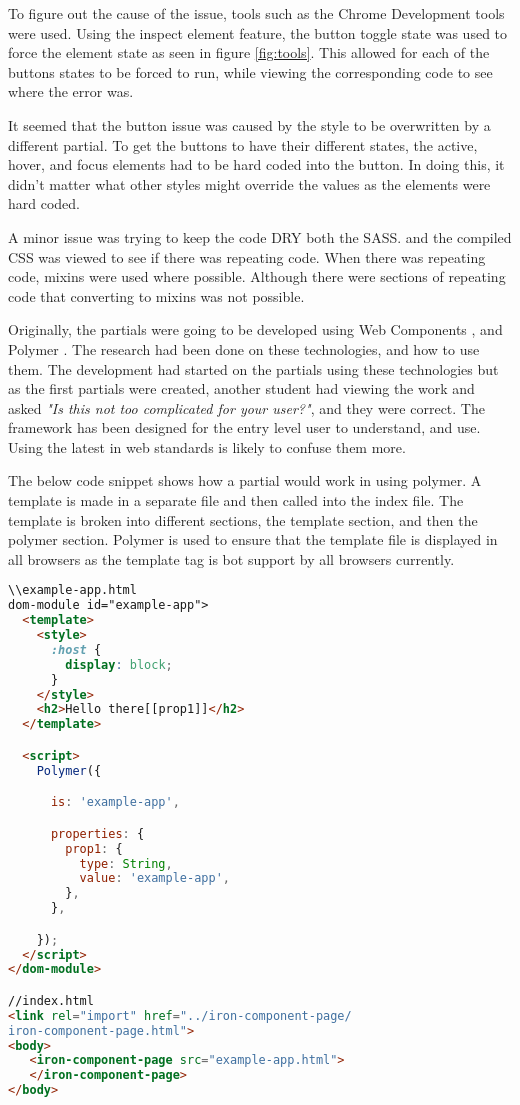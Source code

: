 To figure out the cause of the issue, tools such as the Chrome Development tools were used. Using the inspect element feature, the button toggle state was used to force the element state as seen in figure \ref{fig:tools}. This allowed for each of the buttons states to be forced to run, while viewing the corresponding code to see where the error was. 

It seemed that the button issue was caused by the style to be overwritten by a different partial. To get the buttons to have their different states, the active, hover, and focus elements had to be hard coded into the button. In doing this, it didn't matter what other styles might override the values as the elements were hard coded.

A minor issue was trying to keep the code \gls{DRY} both the \gls{SASS}. and the compiled \gls{CSS} was viewed to see if there was repeating code. When there was repeating code, \gls{mixins} were used where possible. Although there were sections of repeating code that converting to \gls{mixins} was not possible. 

Originally, the partials were going to be developed using Web Components \citep{Web17}, and Polymer \citep{Google17b}. The research had been done on these technologies, and how to use them. The development had started on the partials using these technologies but as the first partials were created, another student had viewing the work and asked \textit{"Is this not too complicated for your user?"}, and they were correct. The framework has been designed for the entry level user to understand, and use. Using the latest in web standards is likely to confuse them more.

The below code snippet shows how a partial would work in using polymer. A template is made in a separate file and then called into the index file. The template is broken into different sections, the template section, and then the polymer section. Polymer is used to ensure that the template file is displayed in all browsers as the template tag is bot support by all browsers currently. 

\begin{lstlisting}[language=HTML]
\\example-app.html
dom-module id="example-app">
  <template>
    <style>
      :host {
        display: block;
      }
    </style>
    <h2>Hello there[[prop1]]</h2>
  </template>

  <script>
    Polymer({

      is: 'example-app',

      properties: {
        prop1: {
          type: String,
          value: 'example-app',
        },
      },

    });
  </script>
</dom-module>

//index.html
<link rel="import" href="../iron-component-page/
iron-component-page.html">
<body>
   <iron-component-page src="example-app.html">
   </iron-component-page>
</body>
\end{lstlisting}

